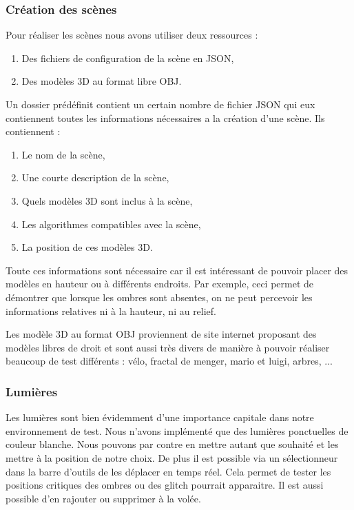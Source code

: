 \documentclass[a4paper,10pt]{report}
\begin{document}
\subsubsection{Création des scènes}

Pour réaliser les scènes nous avons utiliser deux ressources :

\begin{enumerate}
  \item Des fichiers de configuration de la scène en JSON,
  \item Des modèles 3D au format libre OBJ.
\end{enumerate}

Un dossier prédéfinit contient un certain nombre de fichier JSON qui eux contiennent toutes les informations nécessaires a la création d'une scène. Ils contiennent :

\begin{enumerate}
  \item Le nom de la scène,
  \item Une courte description de la scène,
  \item Quels modèles 3D sont inclus à la scène,
  \item Les algorithmes compatibles avec la scène,
  \item La position de ces modèles 3D.
\end{enumerate}

Toute ces informations sont nécessaire car il est intéressant de pouvoir placer des modèles en hauteur ou à différents endroits. Par exemple, ceci permet de démontrer que lorsque les ombres sont absentes, on ne peut percevoir les informations relatives ni à la hauteur, ni au relief.

Les modèle 3D au format OBJ proviennent de site internet proposant des modèles libres de droit et sont aussi très divers de manière à pouvoir réaliser beaucoup de test différents : vélo, fractal de menger, mario et luigi, arbres, ...

\subsubsection{Lumières}

Les lumières sont bien évidemment d'une importance capitale dans notre environnement de test. Nous n'avons implémenté que des lumières ponctuelles de couleur blanche. Nous pouvons par contre en mettre autant que souhaité et les mettre à la position de notre choix. De plus il est possible via un sélectionneur dans la barre d'outils de les déplacer en temps réel. Cela permet de tester les positions critiques des ombres ou des glitch pourrait apparaitre.
Il est aussi possible d'en rajouter ou supprimer à la volée.
\end{document}
